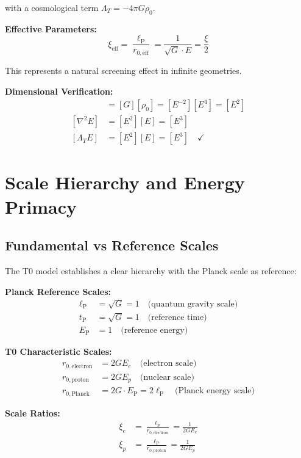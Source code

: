 \documentclass[12pt,a4paper]{report}
\newcommand{\EP}{E_{\text{P}}}            %
\newcommand{\lP}{\ell_{\text{P}}}         %
\newcommand{\tP}{t_{\text{P}}}            %
\newcommand{\Lambdat}{\Lambda_T}          %
\begin{document}
	with a cosmological term $\Lambdat = -4\pi G \rho_0$.
	
	\textbf{Effective Parameters:}
	\begin{equation}
		\xi_{\text{eff}} = \frac{\lP}{r_{0,\text{eff}}} = \frac{1}{\sqrt{G} \cdot E} = \frac{\xi}{2}
		\label{eq:xi_effective}
	\end{equation}
	
	This represents a natural screening effect in infinite geometries.
	
	\textbf{Dimensional Verification:}
	\begin{align}
		[\Lambdat] &= [G][\rho_0] = [E^{-2}][E^4] = [E^2] \\
		[\nabla^2 E] &= [E^2][E] = [E^3] \\
		[\Lambdat E] &= [E^2][E] = [E^3] \quad \checkmark
	\end{align}
	
	\section{Scale Hierarchy and Energy Primacy}\label{sec:scale_hierarchy}
	
	\subsection{Fundamental vs Reference Scales}\label{subsec:fundamental_vs_reference}
	
	The T0 model establishes a clear hierarchy with the Planck scale as reference:
	
	\textbf{Planck Reference Scales:}
	\begin{align}
		\lP &= \sqrt{G} = 1 \quad \text{(quantum gravity scale)} \\
		\tP &= \sqrt{G} = 1 \quad \text{(reference time)} \\
		\EP &= 1 \quad \text{(reference energy)}
	\end{align}
	
	\textbf{T0 Characteristic Scales:}
	\begin{align}
		r_{0,\text{electron}} &= 2GE_e \quad \text{(electron scale)} \\
		r_{0,\text{proton}} &= 2GE_p \quad \text{(nuclear scale)} \\
		r_{0,\text{Planck}} &= 2G \cdot \EP = 2\lP \quad \text{(Planck energy scale)}
	\end{align}
	
	\textbf{Scale Ratios:}
	\begin{align}
		\xi_{e} &= \frac{\lP}{r_{0,\text{electron}}} = \frac{1}{2GE_e} \\
		\xi_{p} &= \frac{\lP}{r_{0,\text{proton}}} = \frac{1}{2GE_p}
	\end{align}
	
\end{document}
